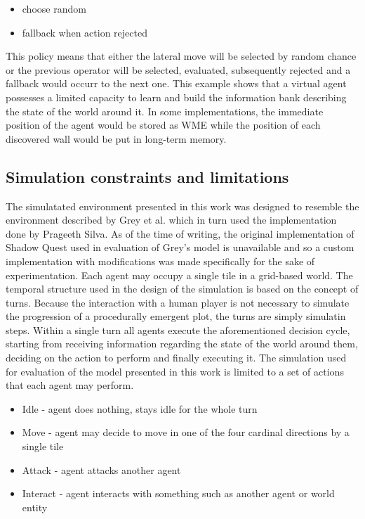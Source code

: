 \begin{itemize}
    \item choose random
    \item fallback when action rejected
\end{itemize}

This policy means that either the lateral move will be selected by random chance or the previous operator will be selected, evaluated, subsequently rejected and a fallback would occurr to the next one.
This example shows that a virtual agent possesses a limited capacity to learn and build the information bank describing the state of the world around it.
In some implementations, the immediate position of the agent would be stored as WME while the position of each discovered wall would be put in long-term memory.

\subsection{Simulation constraints and limitations}

The simulatated environment presented in this work was designed to resemble the environment described by Grey et al.\cite{grey2011procedural} which in turn used the implementation done by Prageeth Silva\cite{silva2010shadow}.
As of the time of writing, the original implementation of Shadow Quest used in evaluation of Grey's model is unavailable and so a custom implementation with modifications was made specifically for the sake of experimentation.
Each agent may occupy a single tile in a grid-based world.
The temporal structure used in the design of the simulation is based on the concept of turns.
Because the interaction with a human player is not necessary to simulate the progression of a procedurally emergent plot, the turns are simply simulatin steps.
Within a single turn all agents execute the aforementioned decision cycle, starting from receiving information regarding the state of the world around them, deciding on the action to perform and finally executing it.
The simulation used for evaluation of the model presented in this work is limited to a set of actions that each agent may perform.

\begin{itemize}
    \item Idle - agent does nothing, stays idle for the whole turn
    \item Move - agent may decide to move in one of the four cardinal directions by a single tile
    \item Attack - agent attacks another agent
    \item Interact - agent interacts with something such as another agent or world entity
\end{itemize}

